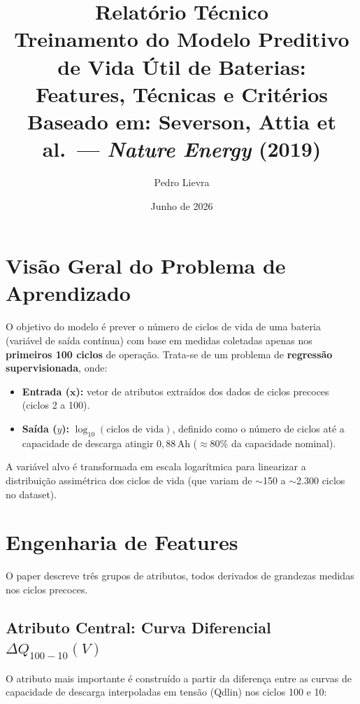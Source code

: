 \documentclass[12pt,a4paper]{article}
\title{
  \vspace{-1cm}
  {\large Relat\'{o}rio T\'{e}cnico} \\[0.4em]
  \textbf{Treinamento do Modelo Preditivo de Vida \'{U}til de Baterias:\\
  Features, T\'{e}cnicas e Crit\'{e}rios} \\[0.4em]
  {\normalsize Baseado em: Severson, Attia et al.\ --- \emph{Nature Energy} (2019)}
}
\author{Pedro Lievra}
\date{Junho de 2026}
\begin{document}
\maketitle
\thispagestyle{fancy}
\tableofcontents
\newpage

\section{Vis\~ao Geral do Problema de Aprendizado}

O objetivo do modelo \'{e} prever o n\'{u}mero de ciclos de vida de uma bateria
(vari\'{a}vel de sa\'{i}da cont\'{i}nua) com base em medidas coletadas apenas nos
\textbf{primeiros 100 ciclos} de opera\c{c}\~ao. Trata-se de um problema de
\textbf{regress\~ao supervisionada}, onde:

\begin{itemize}
  \item \textbf{Entrada ($\mathbf{x}$):} vetor de atributos extra\'{i}dos dos dados
    de ciclos precoces (ciclos 2 a 100).
  \item \textbf{Sa\'{i}da ($y$):} $\log_{10}(\text{ciclos de vida})$, definido como
    o n\'{u}mero de ciclos at\'{e} a capacidade de descarga atingir $0{,}88$\,Ah
    ($\approx 80\%$ da capacidade nominal).
\end{itemize}

A vari\'{a}vel alvo \'{e} transformada em escala logar\'{i}tmica para linearizar a
distribui\c{c}\~ao assim\'{e}trica dos ciclos de vida (que variam de $\sim$150 a
$\sim$2.300 ciclos no dataset).

\section{Engenharia de Features}

O paper descreve tr\^{e}s grupos de atributos, todos derivados de grandezas
medidas nos ciclos precoces.

\subsection{Atributo Central: Curva Diferencial $\Delta Q_{100-10}(V)$}

O atributo mais importante \'{e} constru\'{i}do a partir da diferen\c{c}a entre as
curvas de capacidade de descarga interpoladas em tens\~ao ({\ttfamily Qdlin})
nos ciclos 100 e 10:
\end{document}
